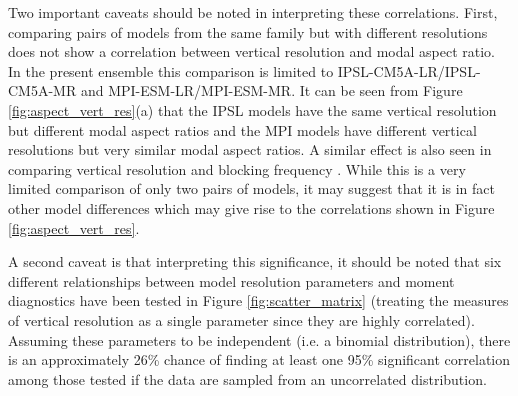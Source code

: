 Two important caveats should be noted in interpreting these correlations. First,
comparing pairs of models from the same family but with different resolutions
does not show a correlation between vertical resolution and modal aspect
ratio. In the present ensemble this comparison is limited to
IPSL-CM5A-LR/IPSL-CM5A-MR and MPI-ESM-LR/MPI-ESM-MR. It can be seen from Figure
\ref{fig:aspect_vert_res}(a) that the IPSL models have the same vertical
resolution but different modal aspect ratios and the MPI models have different
vertical resolutions but very similar modal aspect ratios. A similar effect is
also seen in comparing vertical resolution and blocking frequency
\citep{Anstey2013}. While this is a very limited comparison of only two pairs of
models, it may suggest that it is in fact other model differences which may give
rise to the correlations shown in Figure \ref{fig:aspect_vert_res}.

A second caveat is that interpreting this significance, it should be noted that
six different relationships between model resolution parameters and moment
diagnostics have been tested in Figure \ref{fig:scatter_matrix} (treating the
measures of vertical resolution as a single parameter since they are highly
correlated). Assuming these parameters to be independent (i.e. a binomial
distribution), there is an approximately 26\% chance of finding at least one
95\% significant correlation among those tested if the data are sampled from an
uncorrelated distribution. 

